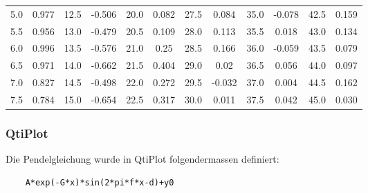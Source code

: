 \begin{center}
\begin{tabular}{*{12}{c}}
        5.0     & 0.977     & 12.5      & -0.506    & 20.0     & 0.082      & 27.5      & 0.084     & 35.0      & -0.078    & 42.5      & 0.159   \\
        5.5     & 0.956     & 13.0      & -0.479    & 20.5     & 0.109      & 28.0      & 0.113     & 35.5      & 0.018     & 43.0      & 0.134   \\
        6.0     & 0.996     & 13.5      & -0.576    & 21.0     & 0.25       & 28.5      & 0.166     & 36.0      & -0.059    & 43.5      & 0.079   \\
        6.5     & 0.971     & 14.0      & -0.662    & 21.5     & 0.404      & 29.0      & 0.02      & 36.5      & 0.056     & 44.0      & 0.097   \\
        7.0     & 0.827     & 14.5      & -0.498    & 22.0     & 0.272      & 29.5      & -0.032    & 37.0      & 0.004     & 44.5      & 0.162   \\
        7.5     & 0.784     & 15.0      & -0.654    & 22.5     & 0.317      & 30.0      & 0.011     & 37.5      & 0.042     & 45.0      & 0.030   \\
        \bottomrule
    \end{tabular}
\end{center}

\clearpage
\subsubsection{QtiPlot}

Die Pendelgleichung wurde in QtiPlot folgendermassen definiert:

\begin{verbatim}
    A*exp(-G*x)*sin(2*pi*f*x-d)+y0
\end{verbatim}

